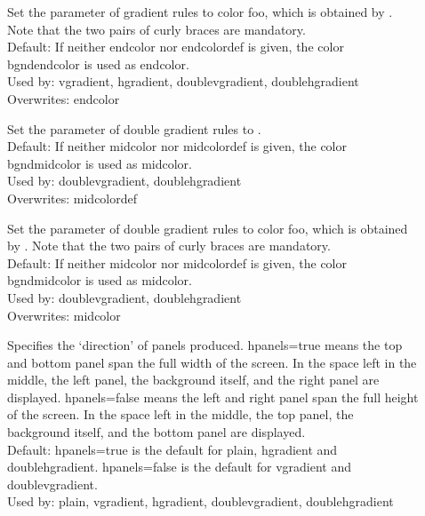 \begin{slide}
\begin{description}
 \item[]
    Set the  parameter of gradient rules to color foo, which
    is obtained by .
    Note that the two pairs of curly braces are mandatory.\\
    Default: If neither endcolor nor endcolordef is given, the color
      bgndendcolor is used as endcolor.\\
    Used by: vgradient, hgradient, doublevgradient, doublehgradient\\
    Overwrites: endcolor

  \item[]
    Set the  parameter of double gradient rules to .\\
    Default: If neither midcolor nor midcolordef is given, the color
      bgndmidcolor is used as midcolor.\\
    Used by: doublevgradient, doublehgradient\\
    Overwrites: midcolordef

  \item[]
    Set the  parameter of double gradient rules to color foo,
    which is obtained by .
    Note that the two pairs of curly braces are mandatory.\\
    Default: If neither midcolor nor midcolordef is given, the color
      bgndmidcolor is used as midcolor.\\
    Used by: doublevgradient, doublehgradient\\
    Overwrites: midcolor

 \item[]
    Specifies the `direction' of panels produced. hpanels=true means the top
    and bottom panel span the full width of the screen. In the space left in
    the middle, the left panel, the background itself, and the right panel are
    displayed. hpanels=false means the left and right panel span the full
    height of the screen. In the space left in the middle, the top panel,
    the background itself, and the bottom panel are
    displayed.\\
    Default: hpanels=true is the default for plain, hgradient and
      doublehgradient. hpanels=false is the default for vgradient and
      doublevgradient.\\
    Used by: plain, vgradient, hgradient, doublevgradient, doublehgradient


\end{description}
\end{slide}
